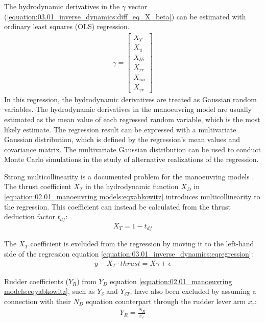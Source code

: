 \noindent The hydrodynamic derivatives in the \(\gamma\) vector (\autoref{equation:03.01_inverse_dynamics:diff_eq_X_beta}) can be estimated with ordinary least squares (OLS) regression.
\begin{equation}\label{equation:03.01_inverse_dynamics:diff_eq_X_beta}
\begin{split}\displaystyle \gamma = \left[\begin{matrix}X_{T}\\X_{u}\\X_{\delta\delta}\\X_{rr}\\X_{uu}\\X_{vr}\end{matrix}\right]\end{split}
\end{equation}
In this regression, the hydrodynamic derivatives are treated as Gaussian random variables. The hydrodynamic derivatives in the manoeuvring model are usually estimated as the mean value of each regressed random variable, which is the most likely estimate. The regression result can be expressed with a multivariate Gaussian distribution, which is defined by the regression’s mean values and covariance matrix. The multivariate Gaussian distribution can be used to conduct Monte Carlo simulations in the study of alternative realizations of the regression.

Strong multicollinearity is a documented problem for the manoeuvring models \cite{luo_parameter_2016, wang_quantifying_2018}.
The thrust coefficient \(X_T\) in the hydrodynamic function \(X_D\) in \autoref{equation:02.01_manoeuvring models:eqxabkowitz} introduces multicollinearity to the regression. This coefficient can instead be calculated from the thrust deduction factor \(t_{df}\):
\begin{equation}\label{equation:03.01_inverse_dynamics:eqXthrust}
\begin{split}\displaystyle X_{T} = 1 - t_{df}\end{split}
\end{equation}

\noindent The \(X_T\) coefficient is excluded from the regression by moving it to the left-hand side of the regression equation \autoref{equation:03.01_inverse_dynamics:eqregression}:
\begin{equation}\label{equation:03.01_inverse_dynamics:eqexclude}
\begin{split}y-X_T \cdot thrust = X \gamma + \epsilon\end{split}
\end{equation}

\noindent Rudder coefficients (\(Y_R\)) from \(Y_D\) equation \autoref{equation:02.01_manoeuvring models:eqyabkowitz}, such as \(Y_{\delta}\) and \(Y_{\delta T}\), have also been excluded by assuming a connection with their \(N_D\) equation counterpart through the rudder lever arm \(x_r\):
\begin{equation}\label{equation:03.01_inverse_dynamics:eqyr}
\begin{split}\displaystyle Y_{R} = \frac{N_{R}}{x_{r'}}\end{split}
\end{equation}